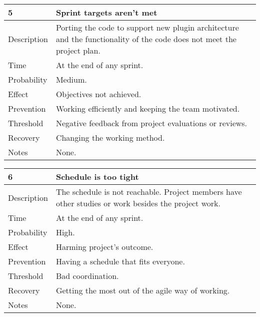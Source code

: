 \documentclass[12pt,titlepage]{article}
\begin{document}
		\begin{center}
		\begin{tabular}{|l|p{10cm}|}
			\hline
			\textbf{5} & \textbf{Sprint targets aren't met} \\
			\hline
			\hline
			Description & Porting the code to support new plugin architecture and the functionality of the code does not meet the project plan. \\
			\hline
			Time & At the end of any sprint. \\
			\hline
			Probability & Medium. \\
			\hline
			Effect & Objectives not achieved. \\
			\hline
			Prevention & Working efficiently and keeping the team motivated. \\
			\hline
			Threshold & Negative feedback from project evaluations or reviews. \\
			\hline
			Recovery & Changing the working method. \\
			\hline
			Notes & None. \\
			\hline
		\end{tabular}
		\end{center}
 
		\begin{center}
		\begin{tabular}{|l|p{10cm}|}
			\hline
			\textbf{6} & \textbf{Schedule is too tight} \\
			\hline
			\hline
			Description & The schedule is not reachable. Project members have other studies or work besides the project work. \\
			\hline
			Time & At the end of any sprint. \\
			\hline
			Probability & High. \\
			\hline
			Effect & Harming project's outcome. \\
			\hline
			Prevention & Having a schedule that fits everyone. \\
			\hline
			Threshold & Bad coordination. \\
			\hline
			Recovery & Getting the most out of the agile way of working. \\
			\hline
			Notes & None. \\
			\hline
		\end{tabular}
		\end{center}
\end{document}
